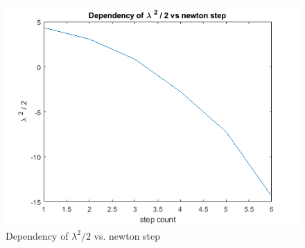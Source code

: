 \documentclass{article}
\begin{document}
\begin{figure}[H]
	\includegraphics[width=\linewidth]{add_ex_plot.png}
	\caption{Dependency of $\lambda ^2 / 2$ vs. newton step}
\end{figure}
\end{document}
